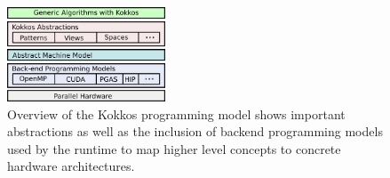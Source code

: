 \begin{figure}
\centerline{\includegraphics[width=0.42\textwidth]{img/Stack.png}}
\caption{Overview of the Kokkos programming model shows important abstractions as well as the inclusion of backend programming models used by the runtime to map higher level concepts to concrete hardware architectures.}
\label{fig:stack}
\end{figure}

